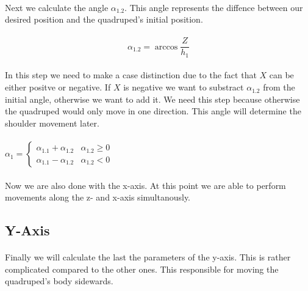 \documentclass{article}
\begin{document}
    \paragraph{}
    Next we calculate the angle $\alpha_{1.2}$. This angle represents the diffence between our desired position and the quadruped's initial position. 

    \paragraph{}
    \begin{equation}
        \alpha_{1.2} = \arccos \frac{Z}{h_1}
    \end{equation}

    \paragraph{}
    In this step we need to make a case distinction due to the fact that $X$ can be either positve or negative. If $X$ is negative we want to substract $\alpha_{1.2}$ from the initial angle, otherwise we want to add it. We need this step because otherwise the quadruped would only move in one direction. This angle will determine the shoulder movement later.

    \paragraph{}
    $\alpha_1 = \left\{
    \begin{array}{ll}
    \alpha_{1.1} + \alpha_{1.2} & \alpha_{1.2} \ge 0 \\
    \alpha_{1.1} - \alpha_{1.2} & \alpha_{1.2} < 0
    \end{array}
    \right. $

    \paragraph{}
    Now we are also done with the x-axis. At this point we are able to perform movements along the z- and x-axis simultanously.



    \pagebreak
    \subsection{Y-Axis}
    \paragraph{} %
    Finally we will calculate the last the parameters of the y-axis. This is rather complicated compared to the other ones. This responsible for moving the quadruped's body sidewards.
    
\end{document}
